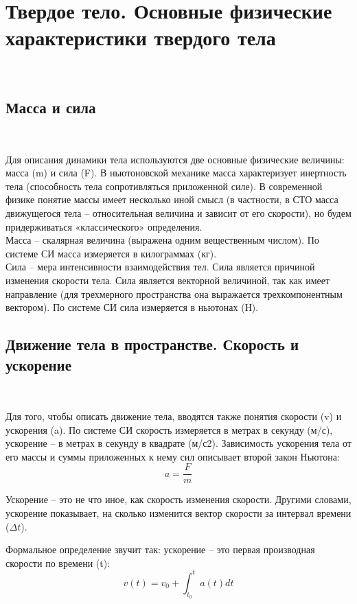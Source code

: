 \chapter{Твердое тело. Основные физические характеристики твердого тела}
\
\section{Масса и сила}
\

Для описания динамики тела используются две основные
физические величины: масса (m) и сила (F). В ньютоновской
механике масса характеризует инертность тела (способность
тела сопротивляться приложенной силе). В современной
физике понятие массы имеет несколько иной смысл (в
частности, в СТО масса движущегося тела – относительная
величина и зависит от его скорости), но будем
придерживаться «классического» определения.
\\

Масса – скалярная величина (выражена одним вещественным числом).
По системе СИ масса измеряется в килограммах (кг).
\\

Сила – мера интенсивности взаимодействия тел. Сила
является причиной изменения скорости тела. Сила является
векторной величиной, так как имеет направление (для трехмерного
пространства она выражается трехкомпонентным вектором). 
По системе СИ сила измеряется в ньютонах (Н).
\\

\section{Движение тела в пространстве. Скорость и ускорение}
\

Для того, чтобы описать движение тела, вводятся также
понятия скорости (v) и ускорения (a). По системе СИ скорость
измеряется в метрах в секунду (м/с), ускорение – в метрах в
секунду в квадрате (м/с2). Зависимость ускорения тела от его
массы и суммы приложенных к нему сил описывает второй
закон Ньютона:
\begin{equation}
a = \frac{F}{m} 
\end{equation}

Ускорение – это не что иное, как скорость изменения
скорости. Другими словами, ускорение показывает, на сколько
изменится вектор скорости за интервал времени (\begin{math}\Delta{t}\end{math}).

Формальное определение звучит так: ускорение – это
первая производная скорости по времени (t):
\begin{equation}
v(t) = v_0 + \int_{t_0}^t a(t)dt
\end{equation}

